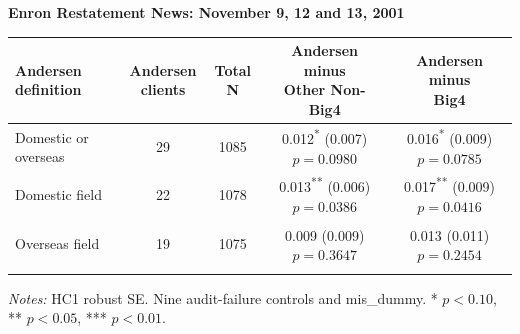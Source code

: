 \documentclass[10pt]{article}
\newcommand{\sym}[1]{\textsuperscript{#1}}
\begin{document}
\fontsize{10}{12}\selectfont\setlength{\parindent}{0pt}
\noindent\textbf{Enron Restatement News: November 9, 12 and 13, 2001}\par\medskip
\setlength{\tabcolsep}{3pt}\renewcommand{\arraystretch}{1.15}
\begin{tabular*}{\textwidth}{@{\extracolsep{\fill}}lcccc@{}}
\toprule
Andersen definition & \shortstack{Andersen\\clients} & Total N & \shortstack{Andersen minus\\Other Non-Big4} & \shortstack{Andersen minus\\Big4} \\
\midrule
Domestic or overseas & 29 & 1085 & \shortstack{0.012\sym{*}\\(0.007)\\$p=0.0980$} & \shortstack{0.016\sym{*}\\(0.009)\\$p=0.0785$} \\ \addlinespace
Domestic field & 22 & 1078 & \shortstack{0.013\sym{**}\\(0.006)\\$p=0.0386$} & \shortstack{0.017\sym{**}\\(0.009)\\$p=0.0416$} \\ \addlinespace
Overseas field & 19 & 1075 & \shortstack{0.009\sym{}\\(0.009)\\$p=0.3647$} & \shortstack{0.013\sym{}\\(0.011)\\$p=0.2454$} \\ \addlinespace
\bottomrule
\end{tabular*}
\par\medskip\fontsize{9}{11}\selectfont\textit{Notes:} HC1 robust SE. Nine audit-failure controls and mis\_dummy. * $p<0.10$, ** $p<0.05$, *** $p<0.01$.
\end{document}
